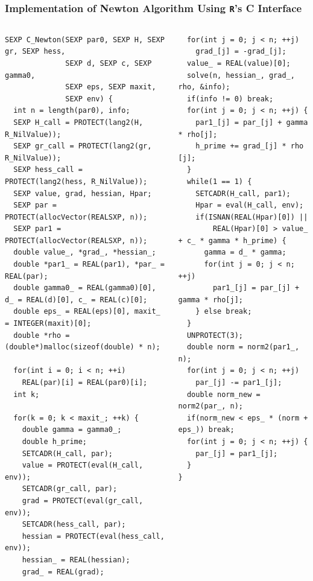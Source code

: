 \documentclass[aspectratio=169]{beamer}
\begin{document}
\begin{frame}[fragile]
    \frametitle{Implementation of Newton Algorithm Using \texttt{R}'s C Interface}
\begin{columns}
\begin{column}{0.5\textwidth}
\begin{verbatim}
SEXP C_Newton(SEXP par0, SEXP H, SEXP gr, SEXP hess,
              SEXP d, SEXP c, SEXP gamma0, 
              SEXP eps, SEXP maxit,
              SEXP env) {
  int n = length(par0), info;
  SEXP H_call = PROTECT(lang2(H, R_NilValue));
  SEXP gr_call = PROTECT(lang2(gr, R_NilValue));
  SEXP hess_call = PROTECT(lang2(hess, R_NilValue));
  SEXP value, grad, hessian, Hpar;
  SEXP par = PROTECT(allocVector(REALSXP, n));
  SEXP par1 = PROTECT(allocVector(REALSXP, n));
  double value_, *grad_, *hessian_; 
  double *par1_ = REAL(par1), *par_ = REAL(par);
  double gamma0_ = REAL(gamma0)[0], d_ = REAL(d)[0], c_ = REAL(c)[0];
  double eps_ = REAL(eps)[0], maxit_ = INTEGER(maxit)[0];
  double *rho = (double*)malloc(sizeof(double) * n);
  
  for(int i = 0; i < n; ++i)
    REAL(par)[i] = REAL(par0)[i];
  int k;
  
  for(k = 0; k < maxit_; ++k) {
    double gamma = gamma0_;
    double h_prime;
    SETCADR(H_call, par);
    value = PROTECT(eval(H_call, env));
    SETCADR(gr_call, par);
    grad = PROTECT(eval(gr_call, env));
    SETCADR(hess_call, par);
    hessian = PROTECT(eval(hess_call, env));
    hessian_ = REAL(hessian);
    grad_ = REAL(grad);
\end{verbatim}
\end{column}
\begin{column}{0.5\textwidth}
\begin{verbatim}
  for(int j = 0; j < n; ++j)
    grad_[j] = -grad_[j];
  value_ = REAL(value)[0];
  solve(n, hessian_, grad_, rho, &info);
  if(info != 0) break;
  for(int j = 0; j < n; ++j) {
    par1_[j] = par_[j] + gamma * rho[j];
    h_prime += grad_[j] * rho [j];
  }
  while(1 == 1) {
    SETCADR(H_call, par1);
    Hpar = eval(H_call, env);
    if(ISNAN(REAL(Hpar)[0]) || 
        REAL(Hpar)[0] > value_ + c_ * gamma * h_prime) {
      gamma = d_ * gamma;
      for(int j = 0; j < n; ++j)
        par1_[j] = par_[j] + gamma * rho[j];
    } else break;
  }
  UNPROTECT(3);
  double norm = norm2(par1_, n);
  for(int j = 0; j < n; ++j)
    par_[j] -= par1_[j];
  double norm_new = norm2(par_, n);
  if(norm_new < eps_ * (norm + eps_)) break;
  for(int j = 0; j < n; ++j) {
    par_[j] = par1_[j];
  }
}
\end{verbatim}
\end{column}
\end{columns}
\end{frame}
\end{document}
